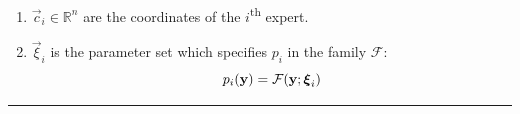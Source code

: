 \begin{table}
\begin{flushleft}
\begin{enumerate}
\begin{enumerate}
						            \begin{equation}
							            [L_k]_{ij} = \begin{cases} \exp(\phi^k_{ij}) & i = j \\ \phi^k_{ij} & i > j \\ 0 &\text{else}\end{cases}
						            \end{equation}
						            This then defines a unique metric, $G_k(\{\phi^k\}) = L_k L_k^\intercal$, which is guaranteed to be positive definite and symmetric. $\phi^k_{ij}$ is otherwise unconstrained
						      \item $\vec{c}_i \in \mathbb{R}^n$ are the coordinates of the $i$\textsuperscript{th} expert.
						      \item $\vec{\xi}_i$ is the parameter set which specifies $p_i$ in the family $\mathcal{F}$:
						            \begin{equation}
							            p_i(\mathbf{\boldsymbol{\mathrm{y}}}) = \mathcal{F}(\mathbf{\boldsymbol{\mathrm{y}}}; \mathbf{\boldsymbol{\mathrm{\xi}}}_i)
						            \end{equation}
					      \end{enumerate}
				\end{enumerate}
			\end{flushleft}
			\hrule
			\caption{The full specification of a \fade{} model.}\label{T:fullModel}
		\end{table}
		\newpage
		\def\vxi{\vec{\xi}}
		\def\vXi{\vec{\Xi}}
